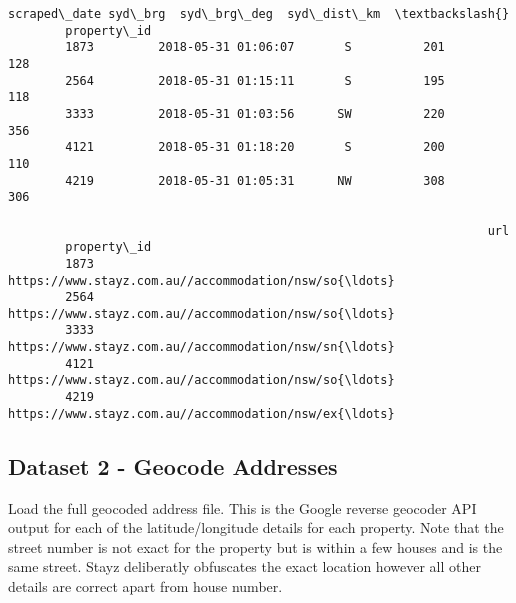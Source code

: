 \documentclass[11pt]{article}
\begin{document}
\begin{Verbatim}[commandchars=\\\{\}]
                            scraped\_date syd\_brg  syd\_brg\_deg  syd\_dist\_km  \textbackslash{}
        property\_id                                                          
        1873         2018-05-31 01:06:07       S          201          128   
        2564         2018-05-31 01:15:11       S          195          118   
        3333         2018-05-31 01:03:56      SW          220          356   
        4121         2018-05-31 01:18:20       S          200          110   
        4219         2018-05-31 01:05:31      NW          308          306   
        
                                                                   url  
        property\_id                                                     
        1873         https://www.stayz.com.au//accommodation/nsw/so{\ldots}  
        2564         https://www.stayz.com.au//accommodation/nsw/so{\ldots}  
        3333         https://www.stayz.com.au//accommodation/nsw/sn{\ldots}  
        4121         https://www.stayz.com.au//accommodation/nsw/so{\ldots}  
        4219         https://www.stayz.com.au//accommodation/nsw/ex{\ldots}  
\end{Verbatim}
            
    \subsection{Dataset 2 - Geocode
Addresses}\label{dataset-2---geocode-addresses}

Load the full geocoded address file. This is the Google reverse geocoder
API output for each of the latitude/longitude details for each property.
Note that the street number is not exact for the property but is within
a few houses and is the same street. Stayz deliberatly obfuscates the
exact location however all other details are correct apart from house
number.
\end{document}
